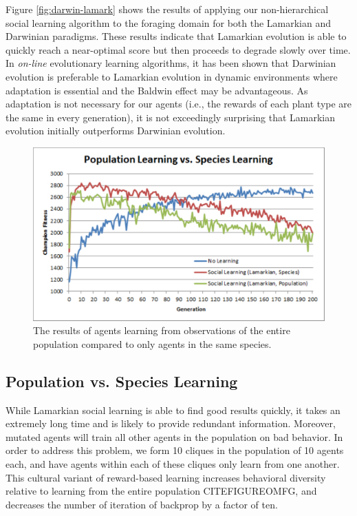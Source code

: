 \documentclass{acm_proc_article-sp}
\begin{document}
Figure \ref{fig:darwin-lamark} shows the results of applying our non-hierarchical social learning algorithm to the foraging domain for both the Lamarkian and Darwinian paradigms. These results indicate that Lamarkian evolution is able to quickly reach a near-optimal score but then proceeds to degrade slowly over time. In  \textit{on-line} evolutionary learning algorithms, it has been shown \cite{whiteson2006evolutionary} that Darwinian evolution is preferable to Lamarkian evolution in dynamic environments where adaptation is essential and the Baldwin effect \cite{simpson1953baldwin} may be advantageous. As adaptation is not necessary for our agents (i.e., the rewards of each plant type are the same in every generation), it is not exceedingly surprising that Lamarkian evolution initially outperforms Darwinian evolution.



\begin{figure}
  \centering
    \includegraphics[scale=.35]{population_species.pdf}
  \caption{The results of agents learning from observations of the entire population compared to only agents in the same species.}
  \label{fig:population-species}
\end{figure}

\subsection*{Population vs. Species Learning}
While Lamarkian social learning is able to find good results quickly, it takes an extremely long time and is likely to provide redundant information.  Moreover, mutated agents will train all other agents in the population on bad behavior.  In order to address this problem, we form 10 cliques in the population of 10 agents each, and have agents within each of these cliques only learn from one another.  This cultural variant of reward-based learning increases behavioral diversity relative to learning from the entire population CITEFIGUREOMFG, and   decreases the number of iteration of backprop by a factor of ten.
\end{document}
